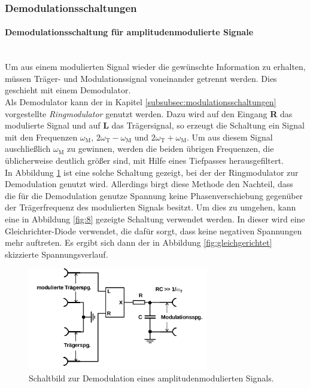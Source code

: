 \FloatBarrier

\subsubsection{Demodulationsschaltungen}
\label{subsubsec:demodulationschaltungen}
\paragraph{Demodulationsschaltung für amplitudenmodulierte Signale}
\mbox{}\\
Um aus einem modulierten Signal wieder die gewünschte Information zu erhalten,
müssen Träger- und Modulationssignal voneinander getrennt werden.
Dies geschieht mit einem Demodulator.\\
Als Demodulator kann der in Kapitel \ref{subsubsec:modulationsschaltungen}
vorgestellte \textit{Ringmodulator} genutzt werden.
Dazu wird auf den Eingang \textbf{R} das modulierte Signal und
auf \textbf{L} das Trägersignal, so erzeugt die Schaltung
ein Signal mit den Frequenzen
$\omega_{\text{M}}$, $2\omega_{\text{T}} - \omega_{\text{M}}$
und $2\omega_{\text{T}} + \omega_{\text{M}}$.
Um aus diesem Signal auschließlich $\omega_{\text{M}}$ zu gewinnen,
werden die beiden übrigen Frequenzen, die üblicherweise deutlich größer sind,
mit Hilfe eines Tiefpasses herausgefiltert.\\
In Abbildung \ref{fig:7} ist eine solche Schaltung gezeigt,
bei der der Ringmodulator zur Demodulation genutzt wird. Allerdings
birgt diese Methode den Nachteil, dass die für die Demodulation genutze
Spannung keine Phasenverschiebung gegenüber der Trägerfrequenz des
modulierten Signals besitzt.
Um dies zu umgehen, kann eine in Abbildung \ref{fig:8} gezeigte
Schaltung verwendet werden. In dieser wird eine Gleichrichter-Diode verwendet,
die dafür sorgt, dass keine negativen Spannungen mehr auftreten.
Es ergibt sich dann der in Abbildung \ref{fig:gleichgerichtet}
skizzierte Spannungsverlauf.




\begin{figure}
\centering
\includegraphics[width=0.7\textwidth]{figures/demodulator.PNG}
\caption{Schaltbild zur Demodulation eines amplitudenmodulierten Signals.\cite{sample}}
\label{fig:7}
\end{figure}

